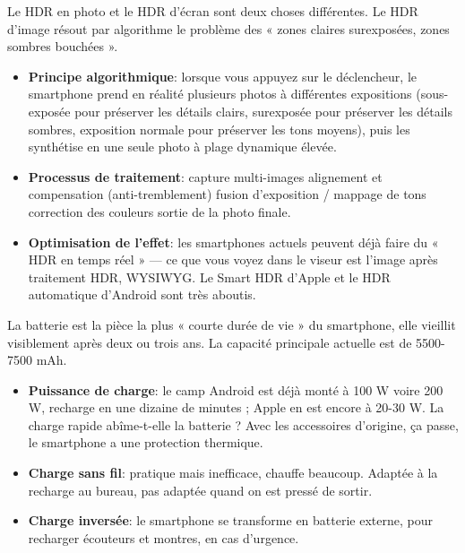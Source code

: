 
Le HDR en photo et le HDR d'écran sont deux choses différentes. Le HDR d'image résout par algorithme le problème des « zones claires surexposées, zones sombres bouchées ».

\begin{itemize}
  \item \textbf{Principe algorithmique}: lorsque vous appuyez sur le déclencheur, le smartphone prend en réalité plusieurs photos à différentes expositions (sous-exposée pour préserver les détails clairs, surexposée pour préserver les détails sombres, exposition normale pour préserver les tons moyens), puis les synthétise en une seule photo à plage dynamique élevée.
  \item \textbf{Processus de traitement}: capture multi-images alignement et compensation (anti-tremblement) fusion d'exposition / mappage de tons correction des couleurs sortie de la photo finale.
  \item \textbf{Optimisation de l'effet}: les smartphones actuels peuvent déjà faire du « HDR en temps réel » — ce que vous voyez dans le viseur est l'image après traitement HDR, WYSIWYG. Le Smart HDR d'Apple et le HDR automatique d'Android sont très aboutis.
\end{itemize}


La batterie est la pièce la plus « courte durée de vie » du smartphone, elle vieillit visiblement après deux ou trois ans. La capacité principale actuelle est de 5500-7500 mAh.

\begin{itemize}
  \item \textbf{Puissance de charge}: le camp Android est déjà monté à 100 W voire 200 W, recharge en une dizaine de minutes ; Apple en est encore à 20-30 W. La charge rapide abîme-t-elle la batterie ? Avec les accessoires d'origine, ça passe, le smartphone a une protection thermique.
  \item \textbf{Charge sans fil}: pratique mais inefficace, chauffe beaucoup. Adaptée à la recharge au bureau, pas adaptée quand on est pressé de sortir.
  \item \textbf{Charge inversée}: le smartphone se transforme en batterie externe, pour recharger écouteurs et montres, en cas d'urgence.
\end{itemize}



